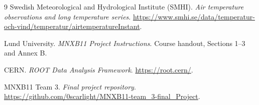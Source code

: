 {}
\begin{thebibliography}{9}
Swedish Meteorological and Hydrological Institute (SMHI).
\emph{Air temperature observations and long temperature series}.
\url{https://www.smhi.se/data/temperatur-och-vind/temperatur/airtemperatureInstant}.

Lund University.
\emph{MNXB11 Project Instructions}.
Course handout, Sections 1--3 and Annex B.

CERN.
\emph{ROOT Data Analysis Framework}.
\url{https://root.cern/}.

MNXB11 Team 3.
\emph{Final project repository}.
\url{https://github.com/0scarlight/MNXB11-team_3-final_Project}.
\end{thebibliography}
